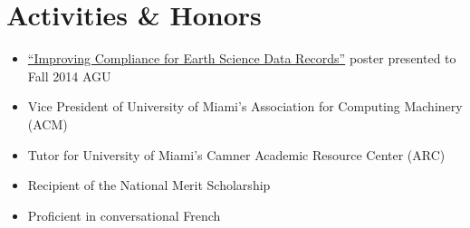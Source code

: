 \documentclass[letterpaper,12pt]{article}
\begin{document}
\vskip 3.5mm

\section*{Activities \& Honors}
\begin{itemize}
  \item \href{https://oychang.com/research/jpl/compliance-checker-poster.pdf}{``Improving Compliance for Earth Science Data Records''} poster presented to Fall 2014 AGU
  \item Vice President of University of Miami's Association for Computing Machinery (ACM)
  \item Tutor for University of Miami's Camner Academic Resource Center (ARC)
  \item Recipient of the National Merit Scholarship
  \item Proficient in conversational French
\end{itemize}
\end{document}
